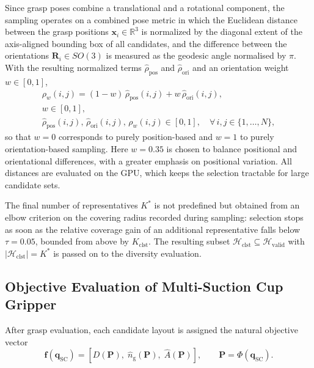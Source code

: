     Since grasp poses combine a translational and a rotational component, the sampling operates on a
    combined pose metric in which the Euclidean distance between the grasp positions
    $\mathbf{x}_i \in \mathbb{R}^3$ is normalized by the diagonal extent of the axis-aligned
    bounding box of all candidates, and the difference between the orientations
    $\mathbf{R}_i \in SO(3)$ is measured as the geodesic angle normalised by $\pi$.
    With the resulting normalized terms $\hat{\rho}_{\mathrm{pos}}$ and $\hat{\rho}_{\mathrm{ori}}$
    and an orientation weight $w \in [0,1]$,
    \begin{equation}
        \label{eq:combined-metric}
        \begin{gathered}
            \rho_w(i,j) =
            (1 - w)\,\hat{\rho}_{\mathrm{pos}}(i,j) + w\,\hat{\rho}_{\mathrm{ori}}(i,j),
            \\[4pt]
            w \in [0,1],
            \\[2pt]
            \hat{\rho}_{\mathrm{pos}}(i,j),\,
            \hat{\rho}_{\mathrm{ori}}(i,j),\,
            \rho_w(i,j) \in [0,1],
            \quad
            \forall\, i,j \in \{1,\ldots,N\},
        \end{gathered}
    \end{equation}
    so that $w = 0$ corresponds to purely position-based and $w = 1$ to purely orientation-based sampling. Here $w = 0.35$ is chosen to balance
    positional and orientational differences, with a greater emphasis on positional variation. All distances are evaluated on the GPU, which keeps the
    selection tractable for large candidate sets.

    The final number of representatives $K^{*}$ is not predefined but obtained from an elbow
    criterion on the covering radius recorded during sampling: selection stops as soon as the
    relative coverage gain of an additional representative falls below $\tau = 0.05$, bounded from
    above by $K_{\mathrm{clst}}$. The resulting subset
    $\mathcal{H}_{\mathrm{clst}} \subseteq \mathcal{H}_{\mathrm{valid}}$ with
    $|\mathcal{H}_{\mathrm{clst}}| = K^{*}$ is passed on to the diversity evaluation.


\subsection{Objective Evaluation of Multi-Suction Cup Gripper}
\label{sec:multi_sc_objective_evaluation}

After grasp evaluation, each candidate layout is assigned the natural objective vector
\begin{equation}
    \mathbf{f}(\mathbf{q}_{\mathrm{SC}})
    =
    \left[
        D(\mathbf{P}),\;
        \hat{n}_{\mathrm{g}}(\mathbf{P}),\;
        \hat{A}(\mathbf{P})
    \right],
    \qquad
    \mathbf{P}=\Phi(\mathbf{q}_{\mathrm{SC}}).
\end{equation}

